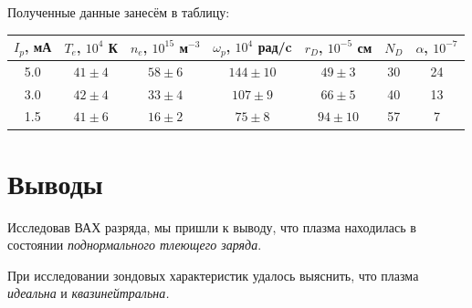 Полученные данные занесём в таблицу:

\begin{table}[h!]
\centering
\begin{tabular}{|c|c|c|c|c|c|c|}
\hline
$I_p$, мА  & $T_e$, $10^4$ К   & $n_e$, $10^{15}$ м$^{-3}$ & $\omega_p$, $10^4$ рад/c & $r_D$, $10^{-5}$ см & $N_D$ & $\alpha$, $10^{-7}$ \\ \hline
5.0 & $41\pm 4$ & $58\pm 6$ & $144\pm 10$   & $49\pm 3$     & 30 & 24\\ \hline
3.0 & $42\pm 4$ & $33\pm 4$ & $107\pm 9$    & $66\pm 5$     & 40 & 13\\ \hline
1.5 & $41\pm 6$ & $16\pm 2$ & $75\pm 8$     & $94 \pm 10$   & 57 & 7\\ \hline
\end{tabular}
\end{table}

\section{Выводы}
Исследовав ВАХ разряда, мы пришли к выводу, что плазма находилась в состоянии \textit{поднормального тлеющего заряда}.

При исследовании зондовых характеристик удалось выяснить, что плазма \textit{идеальна} и \textit{квазинейтральна.}



